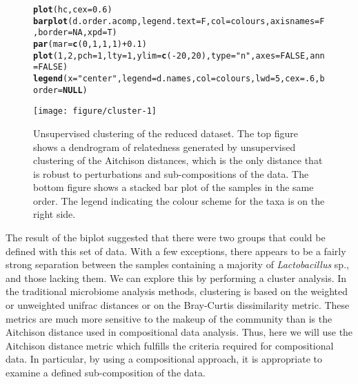 \documentclass[11pt]{article}\usepackage[]{graphicx}\usepackage[]{color}
\makeatletter
\def\maxwidth{ %
  \ifdim\Gin@nat@width>\linewidth
    \linewidth
  \else
    \Gin@nat@width
  \fi
}
\newcommand{\hlnum}[1]{\textcolor[rgb]{0.686,0.059,0.569}{#1}}%
\newcommand{\hlstr}[1]{\textcolor[rgb]{0.192,0.494,0.8}{#1}}%
\newcommand{\hlopt}[1]{\textcolor[rgb]{0,0,0}{#1}}%
\newcommand{\hlstd}[1]{\textcolor[rgb]{0.345,0.345,0.345}{#1}}%
\newcommand{\hlkwa}[1]{\textcolor[rgb]{0.161,0.373,0.58}{\textbf{#1}}}%
\newcommand{\hlkwc}[1]{\textcolor[rgb]{0.333,0.667,0.333}{#1}}%
\newcommand{\hlkwd}[1]{\textcolor[rgb]{0.737,0.353,0.396}{\textbf{#1}}}%
\newenvironment{kframe}{%
 \def\at@end@of@kframe{}%
 \ifinner\ifhmode%
  \def\at@end@of@kframe{\end{minipage}}%
  \begin{minipage}{\columnwidth}%
 \fi\fi%
 \def\FrameCommand##1{\hskip\@totalleftmargin \hskip-\fboxsep
 \colorbox{shadecolor}{##1}\hskip-\fboxsep
     \hskip-\linewidth \hskip-\@totalleftmargin \hskip\columnwidth}%
 \MakeFramed {\advance\hsize-\width
   \@totalleftmargin\z@ \linewidth\hsize
   \@setminipage}}%
 {\par\unskip\endMakeFramed%
 \at@end@of@kframe}
\newenvironment{knitrout}{}{} %
\makeatother
\begin{document}
\begin{figure}
\begin{center}
\begin{knitrout}
\begin{kframe}
\begin{alltt}
\hlkwd{plot}\hlstd{(hc,} \hlkwc{cex}\hlstd{=}\hlnum{0.6}\hlstd{)}
\hlkwd{barplot}\hlstd{(d.order.acomp,} \hlkwc{legend.text}\hlstd{=F,} \hlkwc{col}\hlstd{=colours,} \hlkwc{axisnames}\hlstd{=F,} \hlkwc{border}\hlstd{=}\hlnum{NA}\hlstd{,} \hlkwc{xpd}\hlstd{=T)}
\hlkwd{par}\hlstd{(}\hlkwc{mar}\hlstd{=}\hlkwd{c}\hlstd{(}\hlnum{0}\hlstd{,}\hlnum{1}\hlstd{,}\hlnum{1}\hlstd{,}\hlnum{1}\hlstd{)}\hlopt{+}\hlnum{0.1}\hlstd{)}
\hlkwd{plot}\hlstd{(}\hlnum{1}\hlstd{,}\hlnum{2}\hlstd{,} \hlkwc{pch} \hlstd{=} \hlnum{1}\hlstd{,} \hlkwc{lty} \hlstd{=} \hlnum{1}\hlstd{,} \hlkwc{ylim}\hlstd{=}\hlkwd{c}\hlstd{(}\hlopt{-}\hlnum{20}\hlstd{,}\hlnum{20}\hlstd{),} \hlkwc{type} \hlstd{=} \hlstr{"n"}\hlstd{,} \hlkwc{axes} \hlstd{=} \hlnum{FALSE}\hlstd{,} \hlkwc{ann} \hlstd{=} \hlnum{FALSE}\hlstd{)}
\hlkwd{legend}\hlstd{(}\hlkwc{x}\hlstd{=}\hlstr{"center"}\hlstd{,} \hlkwc{legend}\hlstd{=d.names,} \hlkwc{col}\hlstd{=colours,} \hlkwc{lwd}\hlstd{=}\hlnum{5}\hlstd{,} \hlkwc{cex}\hlstd{=}\hlnum{.6}\hlstd{,} \hlkwc{border}\hlstd{=}\hlkwa{NULL}\hlstd{)}
\end{alltt}
\end{kframe}
\texttt{[image: figure/cluster-1]} 

\end{knitrout}
\caption{Unsupervised clustering of the reduced dataset. The top figure shows a dendrogram of relatedness generated by unsupervised clustering of the Aitchison distances, which is the only distance that is robust to perturbations and sub-compositions of the data\cite{martin1998measures}. The bottom figure shows a stacked bar plot of the samples in the same order. The legend indicating the colour scheme for the taxa is on the right side. }
\label{cluster}
\end{center}
\end{figure}

The result of the biplot suggested that there were two groups that could be defined with this set of data. With a few exceptions, there appears to be a fairly strong separation between  the samples containing a majority of \emph{Lactobacillus} sp., and those lacking them. We can explore this by performing a cluster analysis. In the traditional microbiome analysis methods, clustering is based on the weighted or unweighted unifrac distances or on the Bray-Curtis dissimilarity metric. These metrics are much more sensitive to the makeup of the community than is the Aitchison distance used in compositional data analysis. Thus, here we will use the Aitchison distance metric which fulfills the criteria required for compositional data. In particular, by using a compositional approach, it is appropriate to examine a defined sub-composition of the data. 
\end{document}

